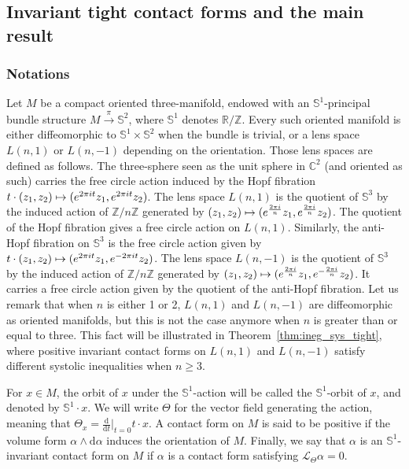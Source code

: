 \documentclass[AHL,Unicode,longabstracts]{cedram}
\newcommand{\bbS}{\mathbb{S}}
\newcommand{\bbZ}{\mathbb{Z}}
\newcommand{\bbR}{\mathbb{R}}
\newcommand{\bbC}{\mathbb{C}}
\newcommand{\clL}{\mathcal{L}}
\newcommand{\rmd}{\mathrm{d}}
\let\oldmapsto\mapsto
\renewcommand*{\mapsto}{\mathchoice{\longmapsto}{\oldmapsto}{\oldmapsto}{\oldmapsto}}
\newcommand{\bbS}{\mathbb{S}}
\begin{document}
\subsection{Invariant tight contact forms and the main result}

\subsubsection{Notations}\label{par:notations}

Let $M$ be a compact oriented three-manifold, endowed with an $\bbS^1$-principal bundle structure $M \xrightarrow{\pi} \bbS^2$, where $\bbS^1$ denotes $\bbR/\bbZ$. Every such oriented manifold is either diffeomorphic to $\bbS^1 \times \bbS^2$ when the bundle is trivial, or a lens space $L(n,1)$ or $L(n,-1)$ depending on the orientation. Those lens spaces are defined as follows. The three-sphere seen as the unit sphere in $\bbC^2$ (and oriented as such) carries the free circle action induced by the Hopf fibration $t \cdot (z_1,z_2) \mapsto (e^{2 \pi i t}z_1, e^{2 \pi i t}z_2)$. The lens space $L(n,1)$ is the quotient of $\bbS^3$ by the induced action of $\bbZ / n \bbZ$ generated by $(z_1, z_2) \mapsto (e^{\frac{2 \pi i}{n}} z_1, e^{\frac{2 \pi i}{n}} z_2)$. The quotient of the Hopf fibration gives a free circle action on $L(n,1)$. Similarly, the anti-Hopf fibration on $\bbS^3$ is the free circle action given by $t \cdot (z_1,z_2) \mapsto (e^{2 \pi i t}z_1, e^{-2 \pi i t}z_2)$. The lens space $L(n,-1)$ is the quotient of $\bbS^3$ by the induced action of $\bbZ / n \bbZ$ generated by $(z_1, z_2) \mapsto (e^{\frac{2 \pi i}{n}} z_1, e^{-\frac{2 \pi i}{n}} z_2)$. It carries a free circle action given by the quotient of the anti-Hopf fibration. Let us remark that when $n$ is either 1 or 2, $L(n,1)$ and $L(n,-1)$ are diffeomorphic as oriented manifolds, but this is not the case anymore when $n$ is greater than or equal to three. This fact will be illustrated in Theorem~\ref{thm:ineg_sys_tight}, where positive invariant contact forms on $L(n,1)$ and $L(n,-1)$ satisfy different systolic inequalities when $n \geq 3$.

For $x \in M$, the orbit of $x$ under the $\bbS^1$-action will be called the $\bbS^1$-orbit of $x$, and denoted by $\bbS^1\cdot x$. We will write $\Theta$ for the vector field generating the action, meaning that $\Theta_x = \frac{\rmd}{\rmd t}|_{t = 0} t \cdot x$. A contact form on $M$ is said to be positive if the volume form $\alpha \wedge \rmd \alpha$ induces the orientation of $M$. Finally, we say that $\alpha$ is an $\bbS^1$-invariant contact form on $M$ if $\alpha$ is a contact form satisfying $\clL_\Theta \alpha = 0$.
\end{document}
